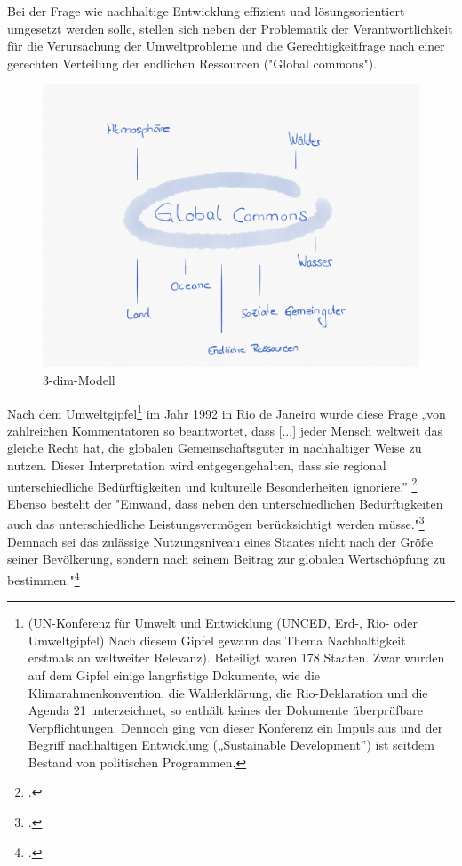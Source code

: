 \documentclass{scrartcl}
\begin{document}
Bei der Frage wie nachhaltige Entwicklung effizient und lösungsorientiert umgesetzt werden solle, stellen sich neben der Problematik der Verantwortlichkeit für die Verursachung der Umweltprobleme und die Gerechtigkeitfrage nach einer gerechten Verteilung der endlichen Ressourcen ("Global commons"). 
\begin{figure}[htbp]
\centering
\includegraphics[width=14cm]{image_folder/globalcommons.png}
\caption{3-dim-Modell}
\label{fig: global commons}
\end{figure}

Nach dem Umweltgipfel\footnote{(UN-Konferenz für Umwelt und Entwicklung (UNCED, Erd-, Rio- oder Umweltgipfel) Nach diesem Gipfel gewann das Thema Nachhaltigkeit erstmals an weltweiter Relevanz). Beteiligt waren 178 Staaten. Zwar wurden auf dem Gipfel einige langrfistige Dokumente, wie die Klimarahmenkonvention, die Walderklärung, die Rio-Deklaration und die Agenda 21 unterzeichnet, so enthält keines der Dokumente überprüfbare Verpflichtungen. Dennoch ging von dieser Konferenz ein Impuls aus und der Begriff nachhaltigen Entwicklung („Sustainable Development”) ist seitdem Bestand von politischen Programmen.} im Jahr 1992 in Rio de Janeiro wurde diese Frage „von zahlreichen Kommentatoren so beantwortet, dass [...] jeder Mensch weltweit das gleiche Recht hat, die globalen Gemeinschaftsgüter in nachhaltiger Weise zu nutzen. Dieser Interpretation wird entgegengehalten, dass sie regional unterschiedliche Bedürftigkeiten und kulturelle Besonderheiten ignoriere.” \footcite{NachhaltigeBrockhaus.de} Ebenso besteht der "Einwand, dass neben den unterschiedlichen Bedürftigkeiten auch das unterschiedliche Leistungsvermögen berücksichtigt werden müsse."\footcite{NachhaltigeBrockhaus.de} Demnach sei das zulässige Nutzungsniveau eines Staates nicht nach der Größe seiner Bevölkerung, sondern nach seinem Beitrag zur globalen Wertschöpfung zu bestimmen."\footcite{NachhaltigeBrockhaus.de}
\end{document}
